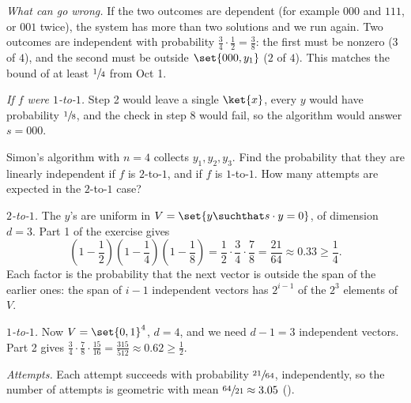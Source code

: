 \begin{exercisebox}
\begin{wsolution}
    \emph{What can go wrong.} If the two outcomes are dependent (for example $000$ and $111$, or
    $001$ twice), the system has more than two solutions and we run again. Two outcomes are
    independent with probability $\frac{3}{4} \cdot \frac{1}{2} = \frac{3}{8}$: the first must be
    nonzero ($3$ of $4$), and the second must be outside $\set{000, y_1}$ ($2$ of $4$). This matches
    the bound of at least $\sfrac{1}{4}$ from Oct 1.

    \emph{If $f$ were $1$-to-$1$.} Step 2 would leave a single $\ket{x}$, every $y$ would have
    probability $\sfrac{1}{8}$, and the check in step 8 would fail, so the algorithm would answer
    $s = 000$.
\end{wsolution}
\end{exercisebox}

\begin{exercisebox}
\begin{pproblem}[Independence for $n = 4$]\label{wp:indep4}
    Simon's algorithm with $n = 4$ collects $y_1, y_2, y_3$. Find the probability that they are
    linearly independent if $f$ is $2$-to-$1$, and if $f$ is $1$-to-$1$. How many attempts are
    expected in the $2$-to-$1$ case?
\end{pproblem}
\tcblower
\begin{wsolution}
    \emph{$2$-to-$1$.} The $y$'s are uniform in $V = \set{y \suchthat s \cdot y = 0}$, of dimension
    $d = 3$. Part 1 of the exercise gives
    \[\left(1 - \frac{1}{2}\right)\left(1 - \frac{1}{4}\right)\left(1 - \frac{1}{8}\right)
        = \frac{1}{2} \cdot \frac{3}{4} \cdot \frac{7}{8} = \frac{21}{64} \approx 0.33 \geq \frac{1}{4}.\]
    Each factor is the probability that the next vector is outside the span of the earlier ones:
    the span of $i - 1$ independent vectors has $2^{i-1}$ of the $2^3$ elements of $V$.

    \emph{$1$-to-$1$.} Now $V = \set{0,1}^4$, $d = 4$, and we need $d - 1 = 3$ independent
    vectors. Part 2 gives
    $\frac{3}{4} \cdot \frac{7}{8} \cdot \frac{15}{16} = \frac{315}{512} \approx 0.62 \geq \frac{1}{2}$.

    \emph{Attempts.} Each attempt succeeds with probability $\sfrac{21}{64}$, independently, so the
    number of attempts is geometric with mean $\sfrac{64}{21} \approx 3.05$ ().
\end{wsolution}
\end{exercisebox}

